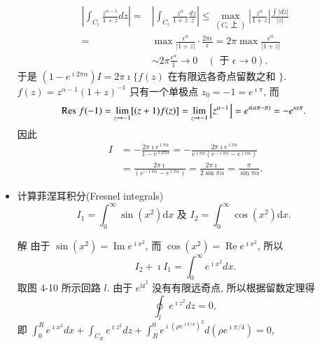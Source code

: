 \begin{itemize}
$$
\begin{aligned}
\left|\int_{C_{\epsilon}} \frac{z^{\alpha-1}}{1+z} d z\right|= & \left|\int_{C_{\epsilon}} \frac{z^\alpha}{1+z} \frac{d z}{z}\right| \leqslant \max _{\left(C_{\epsilon} \text { 上 }\right)}\left|\frac{z^\alpha}{1+z}\right| \frac{\int|d z|}{|z|} \\
= & \max \frac{\epsilon^\alpha}{|1+z|} \cdot \frac{2 \pi \epsilon}{\epsilon}=2 \pi \max \frac{\epsilon^\alpha}{|1+z|} \\
& \sim 2 \pi \frac{\epsilon^\alpha}{1} \rightarrow 0 \quad(\text { 于 } \epsilon \rightarrow 0) .
\end{aligned}
$$
于是 $\left(1-e^{\imath 2 \pi \alpha}\right) I=2 \pi \imath\{f(z)$ 在有限远各奇点留数之和 $\}$.
$f(z)=z^{\alpha-1}(1+z)^{-1}$ 只有一个单极点 $z_0=-1=e^{\imath \pi}$, 而
$$
{\mathrm{Res}\;} f(-1)=\lim _{z \rightarrow-1}[(z+1) f(z)]=\lim _{z \rightarrow-1}\left[z^{\alpha-1}\right]=e^{\imath(\alpha \pi-\pi)}=-e^{\imath \alpha \pi} \text {. }
$$
因此
$$
\begin{aligned}
I & =-\frac{2 \pi \imath e^{\imath \pi \alpha}}{1-e^{\imath 2 \pi \alpha}}=-\frac{2 \pi \imath e^{\imath \pi \alpha}}{e^{\imath \pi \alpha}\left(e^{-\imath \pi \alpha}-e^{\imath \pi \alpha}\right)} \\
& =\frac{2 \pi \imath}{\left(e^{-\imath \pi \alpha}-e^{\imath \pi \alpha}\right)}=\frac{2 \pi \imath}{2 \sin \pi \alpha}=\frac{\pi}{\sin \pi \alpha} .
\end{aligned}
$$

    \item 计算菲涅耳积分(Fresnel integrals)
    $$
    I_1=\int_0^{\infty} \sin \left(x^2\right) \mathrm{d} x \text { 及 } I_2=\int_0^{\infty} \cos \left(x^2\right) \mathrm{d} x \text {. }
    $$

    解 由于 $\sin \left(x^2\right)=\operatorname{Im} e^{\imath x^2}$, 而 $\cos \left(x^2\right)=\operatorname{Re} e^{\imath x^2}$, 所以
$$
I_2+\imath I_1=\int_0^{\infty} e^{\imath x^2} d x .
$$
取图 4-10 所示回路 $l$. 由于 $e^{\mathrm{iz}^2}$ 没有有限远奇点, 所以根据留数定理得
$$
\oint_l e^{\imath z^2} d z=0,
$$
即 $\int_0^R e^{\imath x^2} d x+\int_{C_R} e^{\imath z^2} d z+\int_R^0 e^{\imath\left(\rho e^{\imath \pi / 4}\right)^2} d\left(\rho e^{\imath \pi / 4}\right)=0$,


\end{itemize}
